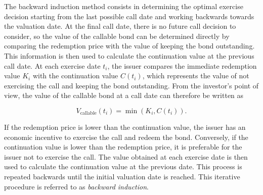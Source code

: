 \documentclass{article}
\begin{document}
The backward induction method consists in determining the optimal
exercise decision starting from the last possible call date and
working backwards towards the valuation date. At the final call date,
there is no future call decision to consider, so the value of the
callable bond can be determined directly by comparing the redemption
price with the value of keeping the bond outstanding. This information
is then used to calculate the continuation value at the previous call
date. At each exercise date $t_i$, the issuer compares the immediate
redemption value $K_i$ with the continuation value $C(t_i)$, which
represents the value of not exercising the call and keeping the bond
outstanding. From the investor's point of view, the value of the
callable bond at a call date can therefore be written as

\begin{equation}
V_{\text{callable}}(t_i)
=
\min\left(K_i, C(t_i)\right).
\end{equation}

If the redemption price is lower than the continuation value, the
issuer has an economic incentive to exercise the call and redeem the
bond. Conversely, if the continuation value is lower than the
redemption price, it is preferable for the issuer not to exercise the
call. The value obtained at each exercise date is then used to
calculate the continuation value at the previous date. This process
is repeated backwards until the initial valuation date is reached.
This iterative procedure is referred to as \textit{backward
induction}.
\end{document}
